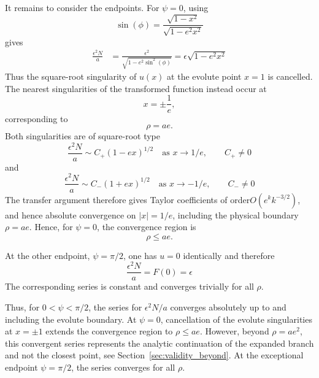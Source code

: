 \documentclass[a4paper]{amsart}
\begin{document}
It remains to consider the endpoints. For $\psi=0$, using
\begin{equation*}
\sin(\phi)
=
\frac{\sqrt{1-x^2}}{\sqrt{1-e^2x^2}}
\end{equation*}
gives
\begin{align*}
\frac{\epsilon^2N}{a}
&=
\frac{\epsilon^2}
{\sqrt{1-e^2\sin^2(\phi)}}
=
\epsilon\sqrt{1-e^2x^2}
\end{align*}
Thus the square-root singularity of $u(x)$ at the evolute point $x=1$ is cancelled. The nearest singularities of the transformed function instead occur at
\begin{equation*}
x=\pm\frac1e,
\end{equation*}
corresponding to
\begin{equation*}
\rho=ae.
\end{equation*}
Both singularities are of square-root type
\begin{equation*}
\frac{\epsilon^2N}{a}
\sim C_+(1-ex)^{1/2}
\quad\text{as }x\to1/e,
\qquad C_+\neq0
\end{equation*}
and
\begin{equation*}
\frac{\epsilon^2N}{a}
\sim C_-(1+ex)^{1/2}
\quad\text{as }x\to-1/e,
\qquad C_-\neq0
\end{equation*}
The transfer argument therefore gives Taylor coefficients
of order\newline $O(e^k k^{-3/2})$, and hence absolute convergence on $|x|=1/e$, including the physical boundary $\rho=ae$. Hence, for $\psi=0$, the convergence region is
\begin{equation*}
\rho\leq ae.
\end{equation*}

At the other endpoint, $\psi=\pi/2$, one has $u=0$ identically and therefore
\begin{equation*}
\frac{\epsilon^2N}{a}
=
F(0)
=
\epsilon
\end{equation*}
The corresponding series is constant and converges trivially for all $\rho$.

Thus, for $0<\psi<\pi/2$, the series for $\epsilon^2N/a$ converges absolutely up to and including the evolute boundary. At $\psi=0$, cancellation of the evolute singularities at $x=\pm1$ extends the convergence region to $\rho\leq ae$. However, beyond $\rho=ae^2$, this convergent series represents the analytic continuation of the expanded branch and not the closest point, see Section~\ref{sec:validity_beyond}. At the exceptional endpoint $\psi=\pi/2$, the series converges for all $\rho$.
\end{document}
